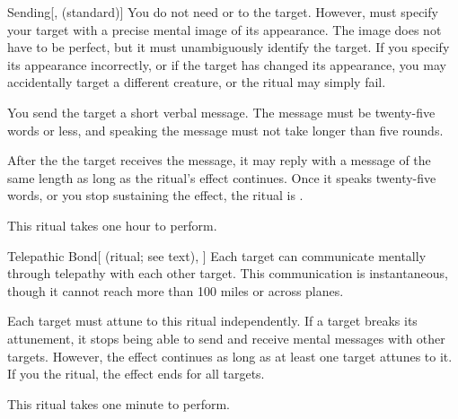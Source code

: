 \lowercase{\hypertarget{spell:Sending}{}}\label{spell:Sending}
\begin{apability}[Rank 4]{\hypertarget{spell:Sending}{Sending}}[,  (standard)]
You do not need  or  to the target.
However,  must specify your target with a precise mental image of its appearance.
The image does not have to be perfect, but it must unambiguously identify the target.
If you specify its appearance incorrectly, or if the target has changed its appearance, you may accidentally target a different creature, or the ritual may simply fail.

You send the target a short verbal message.
The message must be twenty-five words or less, and speaking the message must not take longer than five rounds.

After the the target receives the message, it may reply with a message of the same length as long as the ritual's effect continues.
Once it speaks twenty-five words, or you stop sustaining the effect, the ritual is .

This ritual takes one hour to perform.
\end{apability}
\vspace{0.25em}



\lowercase{\hypertarget{spell:Telepathic Bond}{}}\label{spell:Telepathic Bond}
\begin{attuneability}[Rank 4]{\hypertarget{spell:Telepathic Bond}{Telepathic Bond}}[ (ritual; see text), ]
Each target can communicate mentally through telepathy with each other target.
This communication is instantaneous, though it cannot reach more than 100 miles or across planes.

Each target must attune to this ritual independently.
If a target breaks its attunement, it stops being able to send and receive mental messages with other targets.
However, the effect continues as long as at least one target attunes to it.
If you  the ritual, the effect ends for all targets.

This ritual takes one minute to perform.
\end{attuneability}
\vspace{0.25em}



